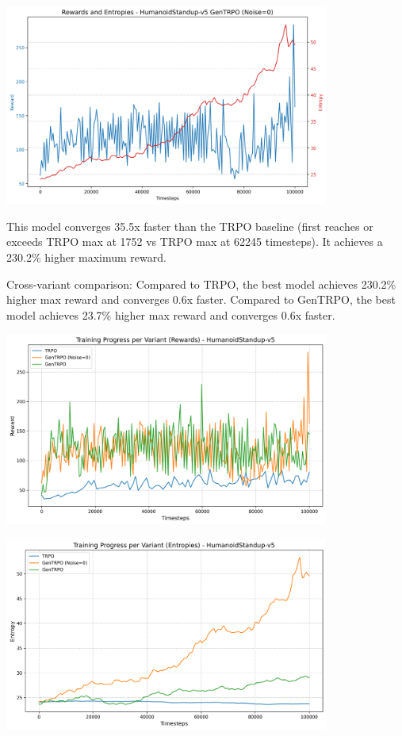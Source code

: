 \documentclass{svproc}
\begin{document}
\begin{center}
\includegraphics[width=0.8\textwidth]{graph_HumanoidStandup-v5_gentrpo_rewards_entropies.png}
\end{center}

This model converges 35.5x faster than the TRPO baseline (first reaches or exceeds TRPO max at 1752 vs TRPO max at 62245 timesteps). It achieves a 230.2\% higher maximum reward.

Cross-variant comparison: Compared to TRPO, the best model achieves 230.2\% higher max reward and converges 0.6x faster. Compared to GenTRPO, the best model achieves 23.7\% higher max reward and converges 0.6x faster. 

\begin{center}
\includegraphics[width=0.8\textwidth]{graph_rewards_HumanoidStandup-v5.png}
\end{center}

\begin{center}
\includegraphics[width=0.8\textwidth]{graph_entropies_HumanoidStandup-v5.png}
\end{center}
\end{document}
